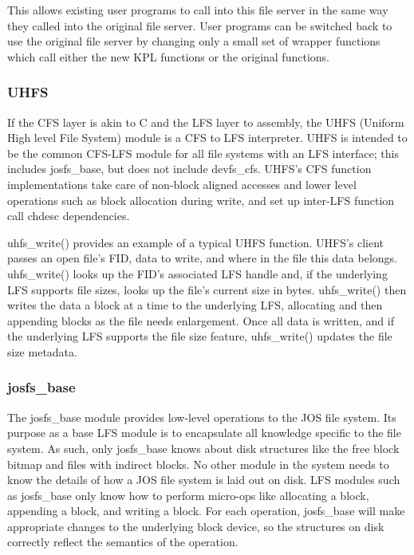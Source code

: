 This allows existing user programs to call into this file server in the same way
they called into the original file server. User programs can be switched back to
use the original file server by changing only a small set of wrapper functions
which call either the new KPL functions or the original functions.

\subsubsection{UHFS}
\label{sec:solution:impl:uhfs}

If the CFS layer is akin to C and the LFS layer to assembly, the UHFS (Uniform
High level File System) module is a CFS to LFS interpreter. UHFS is intended to
be the common CFS-LFS module for all file systems with an LFS interface; this
includes josfs\_base, but does not include \mbox{devfs\_cfs}. UHFS's CFS
function implementations take care of non-block aligned accesses and lower level
operations such as block allocation during write, and set up inter-LFS function
call chdesc dependencies.

uhfs\_write() provides an example of a typical UHFS function. UHFS's client
passes an open file's FID, data to write, and where in the file this data
belongs. uhfs\_write() looks up the FID's associated LFS handle and, if the
underlying LFS supports file sizes, looks up the file's current size in bytes.
uhfs\_write() then writes the data a block at a time to the underlying LFS,
allocating and then appending blocks as the file needs enlargement. Once all
data is written, and if the underlying LFS supports the file size feature,
uhfs\_write() updates the file size metadata.

\subsubsection{josfs\_base}
\label{sec:solution:impl:base}

The josfs\_base module provides low-level operations to the JOS file system.
Its purpose as a base LFS module is to encapsulate all knowledge specific to the
file system. As such, only josfs\_base knows about disk structures like the free
block bitmap and files with indirect blocks. No other module in the system needs
to know the details of how a JOS file system is laid out on disk. LFS modules
such as josfs\_base only know how to perform micro-ops like allocating a block,
appending a block, and writing a block. For each operation, josfs\_base will
make appropriate changes to the underlying block device, so the structures on
disk correctly reflect the semantics of the operation.

